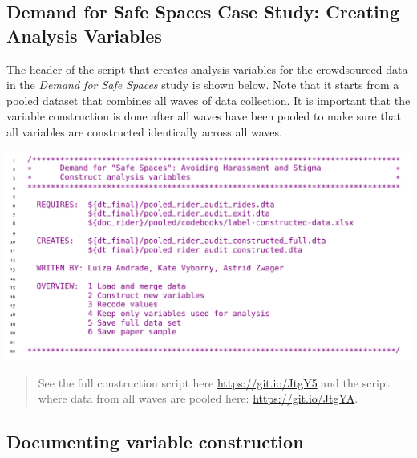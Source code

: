 \documentclass[
]{book}
\begin{document}
\begin{ex}
\hypertarget{demand-for-safe-spaces-case-study-creating-analysis-variables}{%
\subsection{Demand for Safe Spaces Case Study: Creating Analysis Variables}\label{demand-for-safe-spaces-case-study-creating-analysis-variables}}

The header of the script that creates analysis variables for the crowdsourced data in the \emph{Demand for Safe Spaces} study is shown below. Note that it starts from a pooled dataset that combines all waves of data collection. It is important that the variable construction is done after all waves have been pooled to make sure that all variables are constructed identically across all waves.

\includegraphics{examples/ch6-creating-analysis-variables.png}

\begin{quote}
See the full construction script here \url{https://git.io/JtgY5} and the script where data from all waves are pooled here: \url{https://git.io/JtgYA}.
\end{quote}
\end{ex}

\hypertarget{documenting-variable-construction}{%
\subsection*{Documenting variable construction}\label{documenting-variable-construction}}
\end{document}

